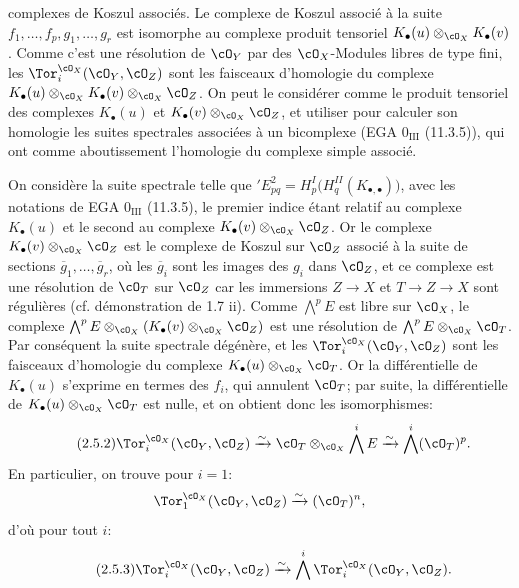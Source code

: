 complexes de Koszul associés. Le complexe de Koszul associé à la suite \(f_1,\ldots,f_p,g_1,\ldots,g_r\) est isomorphe au complexe produit tensoriel \(K_\bullet(u)\otimes_{\cO_X}K_\bullet(v)\). Comme c'est une résolution de \(\cO_Y\) par des \(\cO_X\)-Modules libres de type fini, les \(\Tor_i^{\cO_X}(\cO_Y,\cO_Z)\) sont les faisceaux d'homologie du complexe \(K_\bullet(u)\otimes_{\cO_X}K_\bullet(v)\otimes_{\cO_X}\cO_Z\). On peut le considérer comme le produit tensoriel des complexes \(K_\bullet(u)\) et \(K_\bullet(v)\otimes_{\cO_X}\cO_Z\), et utiliser pour calculer son homologie les suites spectrales associées à un bicomplexe (EGA \(0_{\mathrm{III}}\) (11.3.5)), qui ont comme aboutissement l'homologie du complexe simple associé.

On considère la suite spectrale telle que \({}'E^2_{pq}=H^I_p\bigl(H^{II}_q(K_{\bullet,\bullet})\bigr)\), avec les notations de EGA \(0_{\mathrm{III}}\) (11.3.5), le premier indice étant relatif au complexe \(K_\bullet(u)\) et le second au complexe \(K_\bullet(v)\otimes_{\cO_X}\cO_Z\). Or le complexe \(K_\bullet(v)\otimes_{\cO_X}\cO_Z\) est le complexe de Koszul sur \(\cO_Z\) associé à la suite de sections \(\overline g_1,\ldots,\overline g_r\), où les \(\overline g_i\) sont les images des \(g_i\) dans \(\cO_Z\), et ce complexe est une résolution de \(\cO_T\) sur \(\cO_Z\) car les immersions \(Z\to X\) et \(T\to Z\to X\) sont régulières (cf. démonstration de 1.7 ii). Comme \(\bigwedge^p E\) est libre sur \(\cO_X\), le complexe \(\bigwedge^pE\otimes_{\cO_X}(K_\bullet(v)\otimes_{\cO_X}\cO_Z)\) est une résolution de \(\bigwedge^pE\otimes_{\cO_X}\cO_T\). Par conséquent la suite spectrale dégénère, et les \(\Tor_i^{\cO_X}(\cO_Y,\cO_Z)\) sont les faisceaux d'homologie du complexe \(K_\bullet(u)\otimes_{\cO_X}\cO_T\). Or la différentielle de \(K_\bullet(u)\) s'exprime en termes des \(f_i\), qui annulent \(\cO_T\); par suite, la différentielle de \(K_\bullet(u)\otimes_{\cO_X}\cO_T\) est nulle, et on obtient donc les isomorphismes:
\begin{equation}\tag{2.5.2}
\Tor_i^{\cO_X}(\cO_Y,\cO_Z)
\xrightarrow{\sim}
\cO_T\otimes_{\cO_X}\bigwedge^iE
\xrightarrow{\sim}
\bigwedge^i(\cO_T)^p.
\end{equation}
En particulier, on trouve pour \(i=1\):
\[
\Tor_1^{\cO_X}(\cO_Y,\cO_Z)\xrightarrow{\sim}(\cO_T)^n,
\]
d'où pour tout \(i\):
\begin{equation}\tag{2.5.3}
\Tor_i^{\cO_X}(\cO_Y,\cO_Z)
\xrightarrow{\sim}
\bigwedge^i\Tor_i^{\cO_X}(\cO_Y,\cO_Z).
\end{equation}

